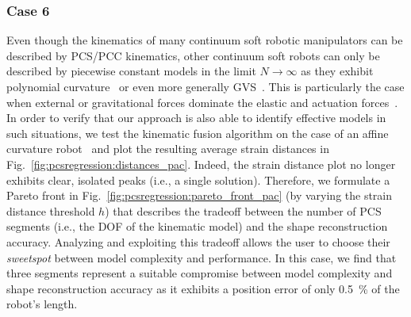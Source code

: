
\subsubsection{Case 6}
Even though the kinematics of many continuum soft robotic manipulators can be described by \gls{PCS}/\gls{PCC} kinematics, other continuum soft robots can only be described by piecewise constant models in the limit $N \to \infty$ as they exhibit polynomial curvature~\cite{della2019control, stella2022experimental} or even more generally \gls{GVS}~\cite{boyer2020dynamics}.
This is particularly the case when external or gravitational forces dominate the elastic and actuation forces~\cite{della2023model}.
In order to verify that our approach is also able to identify effective models in such situations, we test the kinematic fusion algorithm on the case of an affine curvature robot~\cite{stella2023piecewise} and plot the resulting average strain distances in Fig.~\ref{fig:pcsregression:distances_pac}.
Indeed, the strain distance plot no longer exhibits clear, isolated peaks (i.e., a single solution). Therefore, we formulate a Pareto front in Fig.~\ref{fig:pcsregression:pareto_front_pac} (by varying the strain distance threshold $h$) that describes the tradeoff between the number of \gls{PCS} segments (i.e., the \gls{DOF} of the kinematic model) and the shape reconstruction accuracy. Analyzing and exploiting this tradeoff allows the user to choose their \emph{sweetspot} between model complexity and performance.
In this case, we find that three segments represent a suitable compromise between model complexity and shape reconstruction accuracy as it exhibits a position error of only \SI{0.5}{\percent} of the robot's length.



